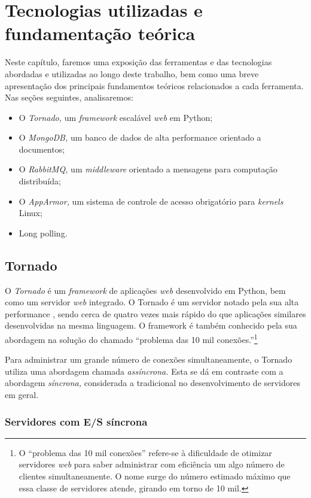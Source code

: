 \documentclass[ruledheader, 12pt]{abnt}
\begin{document}
\chapter{Tecnologias utilizadas e fundamentação teórica}

Neste capítulo, faremos uma exposição das ferramentas e das tecnologias abordadas e utilizadas ao longo deste trabalho, bem como uma breve apresentação dos principais fundamentos teóricos relacionados a cada ferramenta. Nas seções seguintes, analisaremos:
\begin{itemize}
	\item O \emph{Tornado,} um \emph{framework} escalável \emph{web} em Python;
	\item O \emph{MongoDB,} um banco de dados de alta performance orientado a documentos;
	\item O \emph{RabbitMQ,} um \emph{middleware} orientado a mensagens para computação distribuída;
	\item O \emph{AppArmor,} um sistema de controle de acesso obrigatório para \emph{kernels} Linux;
	\item Long polling.
\end{itemize}	
	
\section{Tornado}

O \emph{Tornado} é um \emph{framework} de aplicações \emph{web} desenvolvido em Python, bem como um servidor \emph{web} integrado. O Tornado é um servidor notado pela sua alta performance \cite{tornado2009}, sendo cerca de quatro vezes mais rápido do que aplicações similares desenvolvidas na mesma linguagem. O framework é também conhecido pela sua abordagem na solução do chamado ``problema das 10 mil conexões.''\footnote{O ``problema das 10 mil conexões'' refere-se à dificuldade de otimizar servidores \emph{web} para saber administrar com eficiência um algo número de clientes simultaneamente. O nome surge do número estimado máximo que essa classe de servidores atende, girando em torno de 10 mil.}


Para administrar um grande número de conexões simultaneamente, o Tornado utiliza uma abordagem chamada \emph{assíncrona.} Esta se dá em contraste com a abordagem \emph{síncrona,} considerada a tradicional no desenvolvimento de servidores em geral.

\subsection{Servidores com E/S síncrona}
\end{document}
